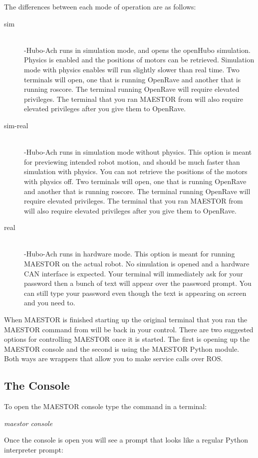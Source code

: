 \documentclass[12pt]{article}
\begin{document}
\noindent The differences between each mode of operation are as follows:
	\begin{description}
		\item[sim] \hfill \\
		-Hubo-Ach runs in simulation mode, and opens the openHubo simulation. Physics is enabled and the positions of motors can be retrieved. Simulation mode with physics enables will run slightly slower than real time. Two terminals will open, one that is running OpenRave and another that is running roscore. The terminal running OpenRave will require elevated privileges. The terminal that you ran MAESTOR from will also require elevated privileges after you give them to OpenRave.
		\item[sim-real] \hfill \\
		-Hubo-Ach runs in simulation mode without physics. This option is meant for previewing intended robot motion, and should be much faster than simulation with physics. You can not retrieve the positions of the motors with physics off. Two terminals will open, one that is running OpenRave and another that is running roscore. The terminal running OpenRave will require elevated privileges. The terminal that you ran MAESTOR from will also require elevated privileges after you give them to OpenRave.
		\item[real] \hfill \\ 
		-Hubo-Ach runs in hardware mode. This option is meant for running MAESTOR on the actual robot. No simulation is opened and a hardware CAN interface is expected. Your terminal will immediately ask for your password then a bunch of text will appear over the password prompt. You can still type your password even though the text is appearing on screen and you need to. 
	\end{description}
	
\noindent When MAESTOR is finished starting up the original terminal that you ran the MAESTOR command from will be back in your control. There are two suggested options for controlling MAESTOR once it is started. The first is opening up the MAESTOR console and the second is using the MAESTOR Python module. Both ways are wrappers that allow you to make service calls over ROS. 

\subsection{The Console}

To open the MAESTOR console type the command in a terminal:
	\begin{center}
		\textit{maestor console}
	\end{center}
Once the console is open you will see a prompt that looks like a regular Python interpreter prompt:
\end{document}
